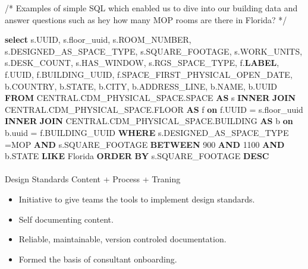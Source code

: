 \documentclass[
]{article}
\makeatletter
\let\oldparagraph\paragraph
\renewcommand{\paragraph}{
    \@ifstar
      \xxxParagraphStar
      \xxxParagraphNoStar
  }
\newcommand{\xxxParagraphStar}[1]{\oldparagraph*{#1}\mbox{}}
\newcommand{\xxxParagraphNoStar}[1]{\oldparagraph{#1}\mbox{}}
\newenvironment{Shaded}{\begin{snugshade}}{\end{snugshade}}
\newcommand{\CommentTok}[1]{\textcolor[rgb]{0.37,0.37,0.37}{#1}}
\newcommand{\DecValTok}[1]{\textcolor[rgb]{0.68,0.00,0.00}{#1}}
\newcommand{\FunctionTok}[1]{\textcolor[rgb]{0.28,0.35,0.67}{#1}}
\newcommand{\KeywordTok}[1]{\textcolor[rgb]{0.00,0.23,0.31}{\textbf{#1}}}
\newcommand{\NormalTok}[1]{\textcolor[rgb]{0.00,0.23,0.31}{#1}}
\newcommand{\OperatorTok}[1]{\textcolor[rgb]{0.37,0.37,0.37}{#1}}
\newcommand{\StringTok}[1]{\textcolor[rgb]{0.13,0.47,0.30}{#1}}
\providecommand{\tightlist}{%
  \setlength{\itemsep}{0pt}\setlength{\parskip}{0pt}}\usepackage{longtable,booktabs,array}
\makeatother
\begin{document}
\begin{Shaded}
\begin{Highlighting}[]
\CommentTok{/* Examples of simple SQL which enabled us to dive into our building data and}
\CommentTok{answer questions such as \textquotesingle{}hey how many MOP rooms are there in Florida?\textquotesingle{}  */}

\KeywordTok{select} 
\NormalTok{    s.UUID,}
\NormalTok{    s.floor\_uuid,}
\NormalTok{    s.ROOM\_NUMBER,}
\NormalTok{    s.DESIGNED\_AS\_SPACE\_TYPE,}
\NormalTok{    s.SQUARE\_FOOTAGE,}
\NormalTok{    s.WORK\_UNITS,}
\NormalTok{    s.DESK\_COUNT,}
\NormalTok{    s.HAS\_WINDOW,}
\NormalTok{    s.RGS\_SPACE\_TYPE,}
\NormalTok{    f.}\KeywordTok{LABEL}\NormalTok{,}
\NormalTok{    f.UUID,}
\NormalTok{    f.BUILDING\_UUID,}
\NormalTok{    f.SPACE\_FIRST\_PHYSICAL\_OPEN\_DATE,}
\NormalTok{    b.COUNTRY,}
\NormalTok{    b.STATE,}
\NormalTok{    b.CITY,}
\NormalTok{    b.ADDRESS\_LINE,}
\NormalTok{    b.NAME,}
\NormalTok{    b.UUID}
\KeywordTok{FROM}\NormalTok{ CENTRAL.CDM\_PHYSICAL\_SPACE.SPACE }\KeywordTok{AS}\NormalTok{ s}
  \KeywordTok{INNER} \KeywordTok{JOIN}\NormalTok{ CENTRAL.CDM\_PHYSICAL\_SPACE.}\FunctionTok{FLOOR} \KeywordTok{AS}\NormalTok{ f }\KeywordTok{on}\NormalTok{ f.UUID }\OperatorTok{=}\NormalTok{ s.floor\_uuid}
  \KeywordTok{INNER} \KeywordTok{JOIN}\NormalTok{ CENTRAL.CDM\_PHYSICAL\_SPACE.BUILDING }\KeywordTok{AS}\NormalTok{ b }\KeywordTok{on}\NormalTok{ b.uuid }\OperatorTok{=}\NormalTok{ f.BUILDING\_UUID}
       \KeywordTok{WHERE}\NormalTok{ s.DESIGNED\_AS\_SPACE\_TYPE }\OperatorTok{=}\StringTok{\textquotesingle{}MOP\textquotesingle{}} 
         \KeywordTok{AND}\NormalTok{ s.SQUARE\_FOOTAGE }\KeywordTok{BETWEEN} \DecValTok{900} \KeywordTok{AND} \DecValTok{1100}
         \KeywordTok{AND}\NormalTok{ b.STATE }\KeywordTok{LIKE} \StringTok{\textquotesingle{}Florida\textquotesingle{}}
    \KeywordTok{ORDER} \KeywordTok{BY}\NormalTok{ s.SQUARE\_FOOTAGE }\KeywordTok{DESC}
\end{Highlighting}
\end{Shaded}

\paragraph{Design Standards Content + Process +
Traning}\label{design-standards-content-process-traning}

\begin{itemize}
\tightlist
\item
  Initiative to give teams the tools to implement design standards.
\item
  Self documenting content.
\item
  Reliable, maintainable, version controled documentation.
\item
  Formed the basis of consultant onboarding.
\end{itemize}
\end{document}
